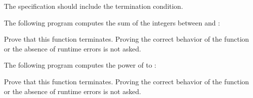 

The specification should include the termination condition.




The following program computes the sum of the integers between 
and :




Prove that this function terminates. Proving the correct behavior of the
function or the absence of runtime errors is not asked.




The following program computes the power of  to :




Prove that this function terminates. Proving the correct behavior of the
function or the absence of runtime errors is not asked.
